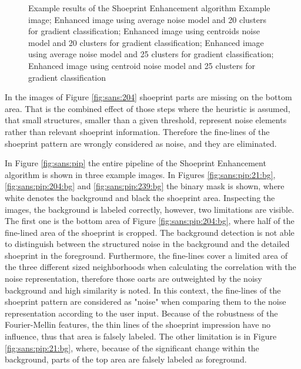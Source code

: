 \documentclass[draft,final]{vutinfth} %
\begin{document}
{\begin{figure}[H]
\caption{Example results of the Shoeprint Enhancement algorithm
				 Example image;  Enhanced image using average noise model and 20 clusters for gradient classification;  Enhanced image using centroids noise model and 20 clusters for gradient classification;  Enhanced image using average noise model and 25 clusters for gradient classification;  Enhanced image using centroid noise model and 25 clusters for gradient classification}
\label{fig:sans:res2}

\end{figure}
}

\par
In the images of Figure \ref{fig:sans:204}  shoeprint parts are missing on the bottom area.
That is the combined effect of those steps where the heuristic is assumed, that small structures, smaller than a given threshold, represent noise elements rather than relevant shoeprint information.
Therefore the fine-lines of the shoeprint pattern are wrongly considered as noise, and they are eliminated.
\par
In Figure \ref{fig:sans:pip} the entire pipeline of the Shoeprint Enhancement algorithm is shown in three example images.
In Figures  \ref{fig:sans:pip:21:bg}, \ref{fig:sans:pip:204:bg} and \ref{fig:sans:pip:239:bg} the binary mask is shown, where white denotes the background and black the shoeprint area.
Inspecting the images, the background is labeled correctly, however, two limitations are visible.
The first one is the bottom area of Figure \ref{fig:sans:pip:204:bg}, where half of the fine-lined area of the shoeprint is cropped.
The background detection is not able to distinguish between the structured noise in the background and the detailed shoeprint in the foreground.
Furthermore, the fine-lines cover a limited area of the three different sized neighborhoods when calculating the correlation with the noise representation, therefore those oarts are outweighted by the noisy background and high similarity is noted.
In this context, the fine-lines of the shoeprint pattern are considered as "noise" when comparing them to the noise representation according to the user input.
Because of the robustness of the Fourier-Mellin features, the thin lines of the shoeprint impression have no influence, thus that area is falsely labeled.
The other limitation is in Figure \ref{fig:sans:pip:21:bg}, where, because of the significant change within the background, parts of the top area are falsely labeled as foreground.
\end{document}
